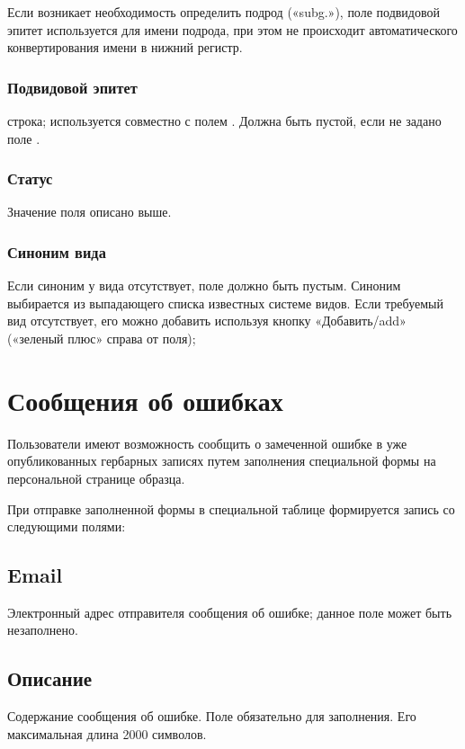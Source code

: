 \documentclass[letterpaper,10pt,russian]{sphinxmanual}
\begin{document}
Если возникает необходимость определить подрод («subg.»),
поле подвидовой эпитет
используется для имени подрода, при этом не происходит
автоматического конвертирования имени в нижний регистр.


\subsubsection{Подвидовой эпитет}
\label{\detokenize{main:id49}}
строка; используется совместно с полем {\hyperref[\detokenize{main:id48}]{}}.
Должна быть пустой, если не задано поле {\hyperref[\detokenize{main:id48}]{}}.


\subsubsection{Статус}
\label{\detokenize{main:id50}}
Значение поля описано выше.

\ignorespaces 

\subsubsection{Синоним вида}
\label{\detokenize{main:id51}}\label{\detokenize{main:index-42}}
Если синоним у вида отсутствует, поле должно быть пустым.
Синоним выбирается из выпадающего списка известных системе видов.
Если требуемый вид отсутствует, его
можно добавить используя кнопку «Добавить/add»
(«зеленый плюс» справа от поля);


\section{Сообщения об ошибках}
\label{\detokenize{main:id52}}
Пользователи имеют возможность сообщить о замеченной ошибке в
уже опубликованных гербарных записях путем заполнения
специальной формы на персональной странице образца.

При отправке заполненной формы в специальной
таблице формируется запись со следующими полями:


\subsection{Email}
\label{\detokenize{main:email}}
Электронный адрес отправителя сообщения об ошибке;
данное поле может быть незаполнено.


\subsection{Описание}
\label{\detokenize{main:id53}}
Содержание сообщения об ошибке. Поле обязательно для заполнения.
Его максимальная длина 2000 символов.
\end{document}
